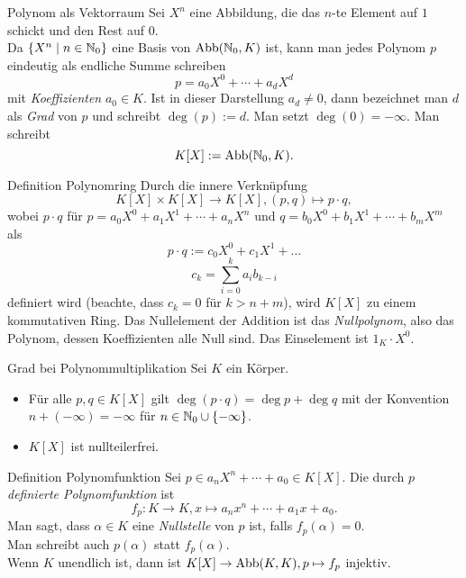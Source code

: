 \documentclass[main.tex]{subfiles}
\begin{document}
\begin{karte}{Polynom als Vektorraum}
    Sei \( X^n \) eine Abbildung, die das \(n\)-te Element auf 
    \(1\) schickt und den Rest auf \(0\).\\
    Da \( \{X^n \;\vert \; n\in \mathbb{N}_0\} \) eine Basis von 
    \( \operatorname{Abb}(\mathbb{N}_0, K) \) ist, kann man jedes 
    Polynom \(p\) eindeutig als endliche Summe schreiben 
    \[ p = a_0 X^0 + \cdots + a_d X^d \] 
    mit \textit{Koeffizienten} \( a_0 \in K \). Ist in dieser 
    Darstellung \( a_d \neq 0 \), dann bezeichnet man \(d\) als 
    \textit{Grad} von \(p\) und schreibt \( \deg(p) := d \). Man 
    setzt \( \deg(0) = -\infty \). Man schreibt 
    \[ K[X] := \operatorname{Abb}(\mathbb{N}_0, K). \]
\end{karte}
\begin{karte}{Definition Polynomring}
    Durch die innere Verknüpfung 
    \[ K[X] \times K[X] \rightarrow K[X], 
    (p,q) \mapsto p \cdot q, \]
    wobei \( p \cdot q \) für \( p = a_0 X^0 + a_1 X^1 
    + \cdots + a_n X^n \) und \( q = b_0 X^0 + b_1 X^1 
    + \cdots + b_m X^m \) als 
    \[ p \cdot q := c_0 X^0 + c_1 X^1 + \ldots \]
    \[ c_k = \sum_{i=0}^k a_i b_{k-i} \]
    definiert wird (beachte, dass \(c_k = 0\) für 
    \( k > n + m \)), wird \( K[X] \) zu einem kommutativen Ring. 
    Das Nullelement der Addition ist das \textit{Nullpolynom}, 
    also das Polynom, dessen Koeffizienten alle Null sind. 
    Das Einselement ist \( 1_K \cdot X^0 \).
\end{karte}
\begin{karte}{Grad bei Polynommultiplikation}
    Sei \(K\) ein Körper. 
    \begin{itemize}
        \item Für alle \( p,q \in K[X] \) gilt 
        \( \deg(p \cdot q) = \deg p + \deg q \) mit der 
        Konvention \( n + (-\infty) = -\infty \) für 
        \( n \in \mathbb{N}_0 \cup \{-\infty\} \).
        \item \( K[X] \) ist nullteilerfrei.
    \end{itemize}
\end{karte}
\begin{karte}{Definition Polynomfunktion}
    Sei \( p \in a_n X^n + \cdots + a_0 \in K[X] \). Die 
    durch \(p\) \textit{definierte Polynomfunktion} ist 
    \[ f_p : K \rightarrow K, x \mapsto a_n x^n + \cdots 
    + a_1 x + a_0. \]
    Man sagt, dass \( \alpha \in K \) eine \textit{Nullstelle} 
    von \(p\) ist, falls \( f_p(\alpha) = 0 \). \\
    Man schreibt auch \( p(\alpha) \) statt \(f_p(\alpha)\).\\
    Wenn \(K\) unendlich ist, dann ist 
    \( K[X] \rightarrow \operatorname{Abb}(K,K), p \mapsto f_p \) injektiv.
\end{karte}
\end{document}
